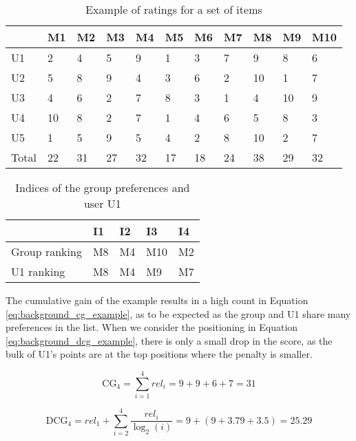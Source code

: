 \begin{table}[H]
	\centering
	\begin{tabular}{l|l|l|l|l|l|l|l|l|l|l|}
		\cline{2-11}
		& M1 & M2 & M3 & M4 & M5 & M6 & M7 & M8 & M9 & M10 \\ \hline
		\multicolumn{1}{|l|}{U1} & 2 & 4 & 5 & 9 & 1 & 3 & 7 & 9 & 8 & 6 \\ \hline
		\multicolumn{1}{|l|}{U2} & 5 & 8 & 9 & 4 & 3 & 6 & 2 & 10 & 1 & 7 \\ \hline
		\multicolumn{1}{|l|}{U3} & 4 & 6 & 2 & 7 & 8 & 3 & 1 & 4 & 10 & 9 \\ \hline
		\multicolumn{1}{|l|}{U4} & 10 & 8 & 2 & 7 & 1 & 4 & 6 & 5 & 8 & 3 \\ \hline
		\multicolumn{1}{|l|}{U5} & 1 & 5 & 9 & 5 & 4 & 2 & 8 & 10 & 2 & 7 \\ \hline
		\multicolumn{1}{|l|}{Total} & 22 & 31 & 27 & 32 & 17 & 18 & 24 & 38 & 29 & 32 \\ \hline
	\end{tabular}
	\caption{Example of ratings for a set of items}
	\label{tbl:testandeval_bordacount}
\end{table}

\begin{table}[H]
	\centering
	\begin{tabular}{l|l|l|l|l|}
		\cline{2-5}
		& I1 & I2 & I3 & I4\\ \hline
		\multicolumn{1}{|l|}{Group ranking} & M8 & M4 & M10 & M2\\ \hline
		\multicolumn{1}{|l|}{U1 ranking} & M8 & M4 & M9 & M7\\ \hline
	\end{tabular}
	\caption{Indices of the group preferences and user U1}
	\label{tbl:testandeval_positions}
\end{table}

The cumulative gain of the example results in a high count in Equation \ref{eq:background_cg_example}, as to be expected as the group and U1 share many preferences in the list. When we consider the positioning in Equation \ref{eq:background_dcg_example}, there is only a small drop in the score, as the bulk of U1's points are at the top positions where the penalty is smaller.

\begin{equation}\label{eq:background_cg_example}
\text{CG}_4 = \sum_{i=1}^{4}\textit{rel}_i = 9 + 9 + 6 + 7 = 31
\end{equation}

\begin{equation}\label{eq:background_dcg_example}
\text{DCG}_4 = \textit{rel}_1 + \sum_{i=2}^{4}\frac{\textit{rel}_i}{\log_2(i)}
= 9 + (9 + 3.79 + 3.5) = 25.29
\end{equation}

